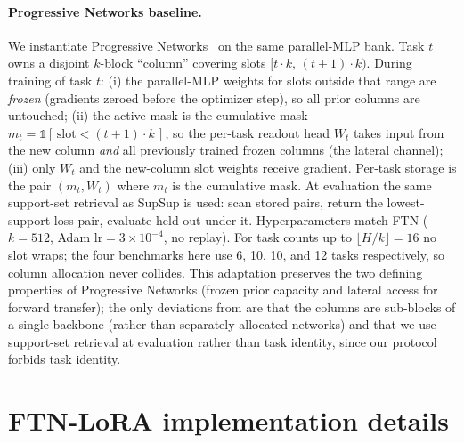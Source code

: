 \documentclass{article}
\begin{document}
\paragraph{Progressive Networks baseline.}
We instantiate Progressive Networks~\citep{rusu2016progressive} on the same parallel-MLP bank. Task $t$ owns a disjoint $k$-block ``column'' covering slots $[t\cdot k,\,(t+1)\cdot k)$. During training of task $t$: (i) the parallel-MLP weights for slots outside that range are \emph{frozen} (gradients zeroed before the optimizer step), so all prior columns are untouched; (ii) the active mask is the cumulative mask $m_t = \mathbb{1}\!\left[\,\mathrm{slot} < (t+1)\cdot k\,\right]$, so the per-task readout head $W_t$ takes input from the new column \emph{and} all previously trained frozen columns (the lateral channel); (iii) only $W_t$ and the new-column slot weights receive gradient. Per-task storage is the pair $(m_t, W_t)$ where $m_t$ is the cumulative mask. At evaluation the same support-set retrieval as SupSup is used: scan stored pairs, return the lowest-support-loss pair, evaluate held-out under it. Hyperparameters match FTN ($k=512$, Adam $\mathrm{lr}=3\times10^{-4}$, no replay). For task counts up to $\lfloor H/k \rfloor = 16$ no slot wraps; the four benchmarks here use 6, 10, 10, and 12 tasks respectively, so column allocation never collides. This adaptation preserves the two defining properties of Progressive Networks (frozen prior capacity and lateral access for forward transfer); the only deviations from \citet{rusu2016progressive} are that the columns are sub-blocks of a single backbone (rather than separately allocated networks) and that we use support-set retrieval at evaluation rather than task identity, since our protocol forbids task identity.



\section{FTN-LoRA implementation details}\label{app:lora_impl}
\end{document}
